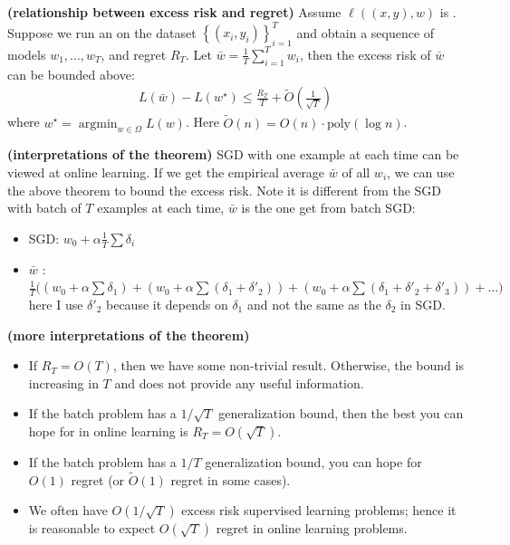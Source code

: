 \documentclass{article}
\newcommand{\bfs}[1]{\textbf{({#1}) }}
\begin{document}
\begin{thma}\bfs{relationship between excess risk and regret}
Assume $\ell((x, y), w)$ is . Suppose we run an  on the dataset $\left\{\left(x_{i}, y_{i}\right)\right\}_{i=1}^{T}$ and obtain a sequence of models $w_{1}, \ldots, w_{T}$, and regret $R_{T}$. Let $\bar{w}=\frac{1}{T} \sum_{i=1}^{T} w_{i}$, then the excess risk of $\bar{w}$ can be bounded above:
\begin{align*}
L(\bar{w})-L\left(w^{\star}\right) \leq \frac{R_{T}}{T}+\widetilde{O}\left(\frac{1}{\sqrt{T}}\right)
\end{align*}
where $w^{\star}=\operatorname{argmin}_{w \in \Omega} L(w)$. Here $\widetilde{O}(n)=O(n)\cdot \text{poly}(\log n)$.
\end{thma} 
\begin{rema}\bfs{interpretations of the theorem}
SGD with one example at each time can be viewed at online learning. If we get the empirical average  $\bar{w}$  of all $w_{i}$, we can use the above theorem to bound the excess risk. Note it is different from the SGD with batch of $T$ examples at each time, $\bar{w}$ is   the one get from batch SGD:
\begin{itemize}
    \item SGD: $w_0+\alpha\frac{1}{T}\sum \delta_i$
    \item $\bar{w}$ : $\frac{1}{T}\bigg((w_0+ \alpha\sum \delta_1)+(w_0+ \alpha\sum (\delta_1+\delta'_2))+(w_0+ \alpha\sum (\delta_1+\delta'_2+\delta'_3))+\ldots\bigg)$
    here I use $\delta'_2$ because it depends on $\delta_1$ and not the same as the $\delta_2$ in SGD.
\end{itemize}
\end{rema}
\begin{rema}\bfs{more interpretations of the theorem}
\begin{itemize}
    \item If $R_{T}=O(T)$, then we have some non-trivial result. Otherwise, the bound is increasing in $T$ and does not provide any useful information.
    \item If the batch problem has a $1 / \sqrt{T}$ generalization bound, then the best you can hope for in online learning is $R_{T}=O(\sqrt{T})$.
    \item If the batch problem has a $1 / T$ generalization bound, you can hope for $O(1)$ regret (or $\widetilde{O}(1)$ regret in some cases).
    \item We often have $O(1/\sqrt{T})$ excess risk supervised learning problems; hence it is reasonable to expect $O(\sqrt{T})$ regret in online learning problems.
\end{itemize} 
\end{rema}
\end{document}
